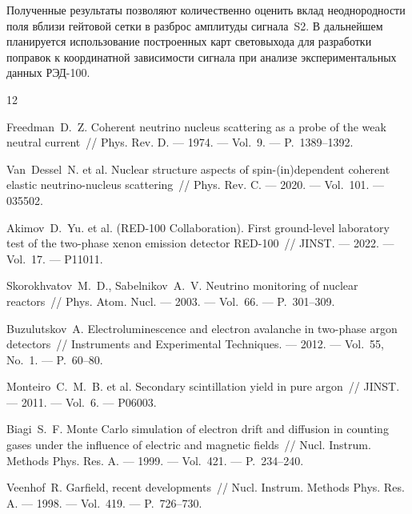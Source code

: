 \documentclass[12pt]{article}
\begin{document}
Полученные результаты позволяют количественно оценить вклад неоднородности
поля вблизи гейтовой сетки в разброс амплитуды сигнала~S2. В дальнейшем
планируется использование построенных карт световыхода для разработки
поправок к координатной зависимости сигнала при анализе экспериментальных
данных РЭД-100.

\newpage
\renewcommand{\refname}{Список использованных источников}

\begin{thebibliography}{12}

Freedman~D.~Z.
Coherent neutrino nucleus scattering as a probe of the weak neutral current~//
Phys. Rev. D. ---
1974. ---
Vol.~9. ---
P.~1389--1392.

Van~Dessel~N. et al.
Nuclear structure aspects of spin-(in)dependent coherent elastic
neutrino-nucleus scattering~//
Phys. Rev. C. ---
2020. ---
Vol.~101. ---
035502.

Akimov~D.~Yu. et al. (RED-100 Collaboration).
First ground-level laboratory test of the two-phase xenon emission detector
RED-100~//
JINST. ---
2022. ---
Vol.~17. ---
P11011.

Skorokhvatov~M.~D., Sabelnikov~A.~V.
Neutrino monitoring of nuclear reactors~//
Phys. Atom. Nucl. ---
2003. ---
Vol.~66. ---
P.~301--309.

Buzulutskov~A.
Electroluminescence and electron avalanche in two-phase argon detectors~//
Instruments and Experimental Techniques. ---
2012. ---
Vol.~55, No.~1. ---
P.~60--80.

Monteiro~C.~M.~B. et al.
Secondary scintillation yield in pure argon~//
JINST. ---
2011. ---
Vol.~6. ---
P06003.

Biagi~S.~F.
Monte Carlo simulation of electron drift and diffusion in counting gases
under the influence of electric and magnetic fields~//
Nucl. Instrum. Methods Phys. Res. A. ---
1999. ---
Vol.~421. ---
P.~234--240.

Veenhof~R.
Garfield, recent developments~//
Nucl. Instrum. Methods Phys. Res. A. ---
1998. ---
Vol.~419. ---
P.~726--730.

\end{thebibliography}
\end{document}
